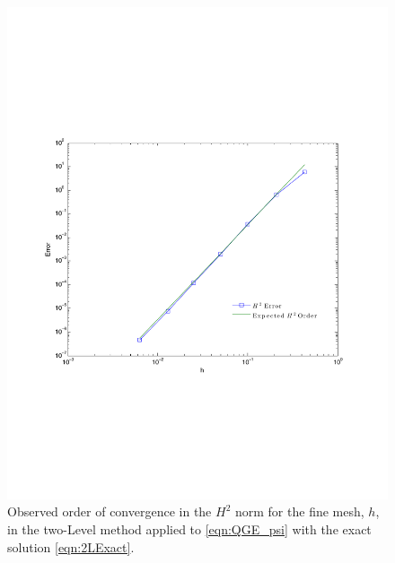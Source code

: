 \begin{figure}
  \begin{center}
    \includegraphics[scale=0.6]{Figures/fineConvergence.pdf}
    \caption{Observed order of convergence in the $H^2$ norm for the fine mesh,
      $h$, in the two-Level method applied to \eqref{eqn:QGE_psi} with the exact
      solution \eqref{eqn:2LExact}.}
  \label{fig:TwoLevelh}
  \end{center}
\end{figure}
